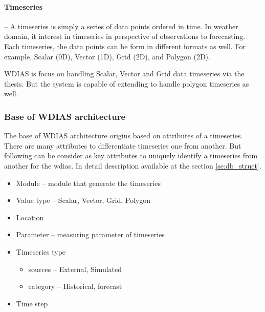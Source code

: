 \paragraph{Timeseries}-- A timeseries is simply a series of data points ordered in time. In weather domain, it interest in timeseries in perspective of observations to forecasting. Each timeseries, the data points can be form in different formats as well. For example, Scalar (0D), Vector (1D), Grid (2D), and Polygon (2D).
    
WDIAS is focus on handling Scalar, Vector and Grid data timeseries via the thesis. But the system is capable of extending to handle polygon timeseries as well.

\subsubsection{Base of WDIAS architecture}
The base of WDIAS architecture origins based on attributes of a timeseries. There are many attributes to differentiate timeseries one from another. But following can be consider as key attributes to uniquely identify a timeseries from another for the \acrshort{wdias}. In detail description available at the section \ref{se:db_struct}.
\begin{itemize}
    \item Module -- module that generate the timeseries
    \item Value type -- Scalar, Vector, Grid, Polygon
    \item Location 
    \item Parameter -- measuring parameter of timeseries
    \item Timeseries type
    \begin{itemize}
        \item sources -- External, Simulated
        \item category -- Historical, forecast
    \end{itemize}
    \item Time step
\end{itemize}
